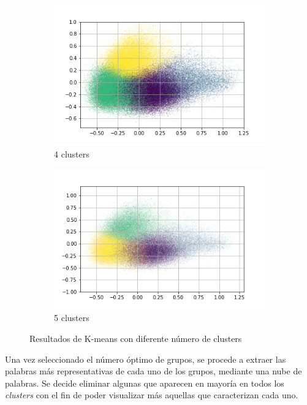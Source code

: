 \begin{figure}
\begin{subfigure}[b]{0.4\textwidth}
         \includegraphics[width=\textwidth]{results/TopicDetection/es/PCA_4.png}
         \caption{4 clusters}
         \label{fig:es_kmeans_4}
     \end{subfigure}
     \hfill
     \begin{subfigure}[b]{0.4\textwidth}
         \centering
         \includegraphics[width=\textwidth]{results/TopicDetection/es/PCA_5.png}
         \caption{5 clusters}
         \label{fig:es_kmeans_5}
     \end{subfigure}
        \caption{Resultados de K-means con diferente número de clusters}
        \label{fig:es_kmeans}
\end{figure}

Una vez seleccionado el número óptimo de grupos, se procede a extraer las palabras más representativas de cada uno de los grupos, mediante una nube de palabras. Se decide eliminar algunas que aparecen en mayoría en todos los \textit{clusters} con el fin de poder visualizar más aquellas que caracterizan cada uno.

